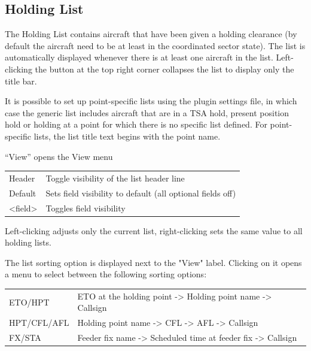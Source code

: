 \documentclass[a4paper,oneside,11pt]{memoir}
\begin{document}
\subsection{Holding List}\label{list:hold}


The Holding List contains aircraft that have been given a holding clearance (by default the aircraft need to be at least in the coordinated sector state). The list is automatically displayed whenever there is at least one aircraft in the list. Left-clicking the button at the top right corner collapses the list to display only the title bar.

\bigskip

It is possible to set up point-specific lists using the plugin settings file, in which case the generic list includes aircraft that are in a TSA hold, present position hold or holding at a point for which there is no specific list defined. For point-specific lists, the list title text begins with the point name.

\bigskip

“View” opens the View menu

\begin{longtable}{p{5cm} p{7.5cm}}
  Header  & Toggle visibility of the list header line\\
  Default & Sets field visibility to default (all optional fields off)\\
  <field> & Toggles field visibility\\
\end{longtable}

Left-clicking adjusts only the current list, right-clicking sets the same value to all holding lists.

\bigskip

The list sorting option is displayed next to the "View" label. Clicking on it opens a menu to select between the following sorting options:

\bigskip

\begin{longtable}{p{5cm} p{7.5cm}}
  ETO/HPT     & ETO at the holding point -> Holding point name -> Callsign\\
  HPT/CFL/AFL & Holding point name -> CFL -> AFL -> Callsign\\
  FX/STA      & Feeder fix name -> Scheduled time at feeder fix -> Callsign\\
\end{longtable}
\end{document}

